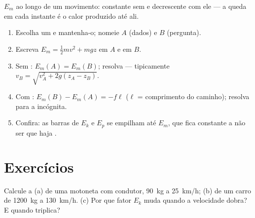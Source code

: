 \begin{omfigure}

{\small $E_m$ ao longo de um movimento: constante sem  e
decrescente com ele --- a queda em cada instante é o calor produzido até
ali.}
\end{omfigure}

\begin{method}\label{met:g11:mechanical-energy:bookkeeping}
\begin{enumerate}
  \item Escolha um  e mantenha-o; nomeie $A$ (dados) e
        $B$ (pergunta).
  \item Escreva $E_m = \tfrac12 mv^2 + mgz$ em $A$ e em $B$.
  \item Sem : $E_m(A) = E_m(B)$; resolva --- tipicamente
        $v_B = \sqrt{v_A^2 + 2g(z_A - z_B)}$.
  \item Com : $E_m(B) - E_m(A) = -f\ell$ ($\ell$ = comprimento do
        caminho); resolva para a incógnita.
  \item Confira: as barras de $E_k$ e $E_p$ se empilham até $E_m$, que
        fica constante a não ser que haja .
\end{enumerate}
\end{method}

\section{Exercícios}

\begin{exercise}[$\star$]\label{exo:g11:mechanical-energy:1}
Calcule a  (a) de uma motoneta com condutor,
\qty{90}{kg} a \qty{25}{km/h}; (b) de um carro de \qty{1200}{kg} a
\qty{130}{km/h}. (c) Por que fator $E_k$ muda quando a velocidade dobra?
E quando triplica?
\end{exercise}

